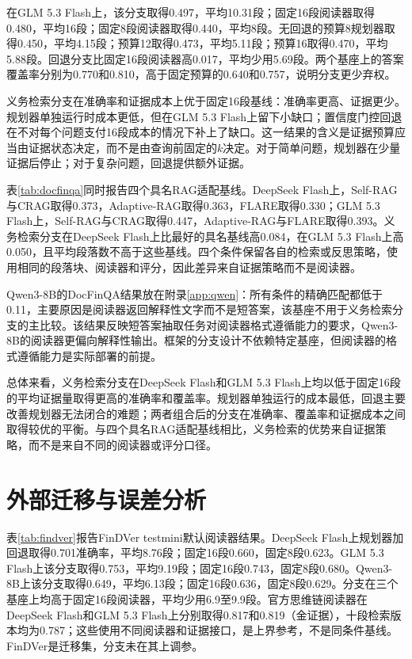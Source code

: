在GLM 5.3 Flash上，该分支取得0.497，平均10.31段；固定16段阅读器取得0.480，平均16段；固定8段阅读器取得0.440，平均8段。无回退的预算8规划器取得0.450，平均4.15段；预算12取得0.473，平均5.11段；预算16取得0.470，平均5.88段。回退分支比固定16段阅读器高0.017，平均少用5.69段。两个基座上的答案覆盖率分别为0.770和0.810，高于固定预算的0.640和0.757，说明分支更少弃权。

义务检索分支在准确率和证据成本上优于固定16段基线：准确率更高、证据更少。规划器单独运行时成本更低，但在GLM 5.3 Flash上留下小缺口；置信度门控回退在不对每个问题支付16段成本的情况下补上了缺口。这一结果的含义是证据预算应当由证据状态决定，而不是由查询前固定的$k$决定。对于简单问题，规划器在少量证据后停止；对于复杂问题，回退提供额外证据。

表\ref{tab:docfinqa}同时报告四个具名RAG适配基线。DeepSeek Flash上，Self-RAG与CRAG取得0.373，Adaptive-RAG取得0.363，FLARE取得0.330；GLM 5.3 Flash上，Self-RAG与CRAG取得0.447，Adaptive-RAG与FLARE取得0.393。义务检索分支在DeepSeek Flash上比最好的具名基线高0.084，在GLM 5.3 Flash上高0.050，且平均段落数不高于这些基线。四个条件保留各自的检索或反思策略，使用相同的段落块、阅读器和评分，因此差异来自证据策略而不是阅读器。

Qwen3-8B的DocFinQA结果放在附录\ref{app:qwen}：所有条件的精确匹配都低于0.11，主要原因是阅读器返回解释性文字而不是短答案，该基座不用于义务检索分支的主比较。该结果反映短答案抽取任务对阅读器格式遵循能力的要求，Qwen3-8B的阅读器更偏向解释性输出。框架的分支设计不依赖特定基座，但阅读器的格式遵循能力是实际部署的前提。



总体来看，义务检索分支在DeepSeek Flash和GLM 5.3 Flash上均以低于固定16段的平均证据量取得更高的准确率和覆盖率。规划器单独运行的成本最低，回退主要改善规划器无法闭合的难题；两者组合后的分支在准确率、覆盖率和证据成本之间取得较优的平衡。与四个具名RAG适配基线相比，义务检索的优势来自证据策略，而不是来自不同的阅读器或评分口径。





\section{外部迁移与误差分析}

表\ref{tab:findver}报告FinDVer testmini默认阅读器结果。DeepSeek Flash上规划器加回退取得0.701准确率，平均8.76段；固定16段0.660，固定8段0.623。GLM 5.3 Flash上该分支取得0.753，平均9.19段；固定16段0.743，固定8段0.680。Qwen3-8B上该分支取得0.649，平均6.13段；固定16段0.636，固定8段0.629。分支在三个基座上均高于固定16段阅读器，平均少用6.9至9.9段。官方思维链阅读器在DeepSeek Flash和GLM 5.3 Flash上分别取得0.817和0.819（金证据），十段检索版本均为0.787；这些使用不同阅读器和证据接口，是上界参考，不是同条件基线。FinDVer是迁移集，分支未在其上调参。

